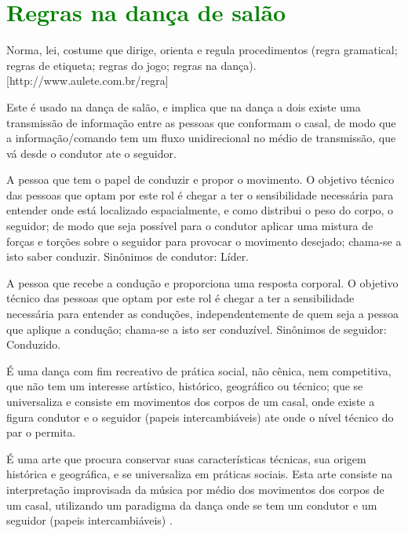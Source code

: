 
\chapter{\textcolor{green}{Regras na dança de salão}}

\begin{definition}[Regra:]
Norma, lei, costume que dirige, orienta e regula procedimentos (regra gramatical; regras de etiqueta; regras do jogo; regras na dança).
[http://www.aulete.com.br/regra]
\end{definition}
\begin{definition} Este é usado na dança de salão, 
e implica que na dança a dois existe uma transmissão de informação
entre as pessoas que conformam o casal, 
de modo que a informação/comando tem um fluxo unidirecional no médio de transmissão,
que vá desde o condutor ate o seguidor. 
\end{definition}
\begin{definition} 
A pessoa que tem o papel de conduzir e propor o movimento. 
O objetivo técnico das pessoas que optam por este rol é chegar 
a ter o sensibilidade necessária para entender onde está localizado espacialmente, 
e como distribui o peso do corpo, o seguidor; 
de modo que seja possível para o condutor aplicar uma mistura de forças e torções sobre o seguidor para provocar o movimento desejado;
chama-se a isto saber conduzir.
Sinônimos de condutor: Líder.
\end{definition}
\begin{definition} 
A pessoa que recebe a condução e proporciona uma resposta corporal. 
O objetivo técnico das pessoas que optam por este rol é chegar 
a ter a sensibilidade necessária para entender as conduções,
independentemente de quem seja a pessoa que aplique a condução;
chama-se a isto ser conduzível.
Sinônimos de seguidor: Conduzido.
\end{definition}
\begin{definition}
É uma dança com fim recreativo de prática social, não cênica, nem competitiva, 
que não tem um interesse artístico, histórico, geográfico ou técnico; 
que se universaliza e consiste em movimentos dos corpos de um casal, 
onde existe a figura condutor e o seguidor (papeis intercambiáveis) \cite{Zamoner2012} ate onde o nível técnico do par o permita.
\end{definition}
\begin{definition}
É uma arte que procura conservar suas características técnicas, 
sua origem histórica e geográfica, e se universaliza em práticas sociais. 
Esta arte consiste na interpretação improvisada da música por médio dos movimentos 
dos corpos de um casal, utilizando um paradigma da dança onde se tem um condutor e um seguidor (papeis intercambiáveis) \cite{Zamoner2012}.
\end{definition}


